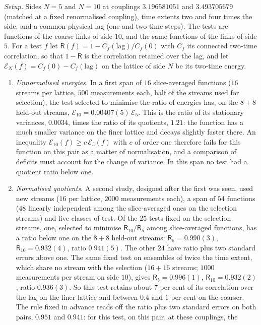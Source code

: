 \emph{Setup.} Sides $N=5$ and $N=10$ at couplings $3.196581051$ and $3.493705679$ (matched at a fixed
renormalised coupling), time extents two and four times the side, and a common physical lag (one and two time
steps). The tests are functions of the coarse links of side $10$, and the same functions of the links of side
$5$. For a test $f$ let $\mathsf R(f)=1-C_f(\mathrm{lag})/C_f(0)$ with $C_f$ its connected two-time
correlation, so that $1-\mathsf R$ is the correlation retained over the lag, and let
$\mathcal E_N(f)=C_f(0)-C_f(\mathrm{lag})$ on the lattice of side $N$ be its two-time energy.
\begin{enumerate}
\item \emph{Unnormalised energies.} In a first span of $16$ slice-averaged functions ($16$ streams per
lattice, $500$ measurements each, half of the streams used for selection), the test selected to minimise the
ratio of energies has, on the $8+8$ held-out streams, $\mathcal E_{10}=0.00407(5)\,\mathcal E_5$. This is the
ratio of its stationary variances, $0.0034$, times the ratio of its quotients, $1.21$: the function has a much
smaller variance on the finer lattice and decays slightly faster there. An inequality
$\mathcal E_{10}(f)\ge c\,\mathcal E_5(f)$ with $c$ of order one therefore fails for this function on this
pair as a matter of normalisation, and a comparison of deficits must account for the change of variance. In
this span no test had a quotient ratio below one.
\item \emph{Normalised quotients.} A second study, designed after the first was seen, used new streams ($16$
per lattice, $2000$ measurements each), a span of $54$ functions ($48$ linearly independent among the
slice-averaged ones on the selection streams) and five classes of test. Of the $25$ tests
fixed on the selection streams, one, selected to minimise $\mathsf R_{10}/\mathsf R_5$ among slice-averaged
functions, has a ratio below one on the $8+8$ held-out streams: $\mathsf R_5=0.990(3)$,
$\mathsf R_{10}=0.932(4)$, ratio $0.941(5)$. The other $24$ have ratio plus two standard errors above one. The
same fixed test on ensembles of twice the time extent, which share no stream with the selection ($16+16$
streams; $1000$ measurements per stream on side $10$), gives $\mathsf R_5=0.996(1)$, $\mathsf R_{10}=0.932(2)$,
ratio $0.936(3)$. So this test retains about $7$ per cent of its correlation over the lag on the finer lattice
and between $0.4$ and $1$ per cent on the coarser. The rule fixed in advance reads off the ratio plus two
standard errors on both pairs, $0.951$ and $0.941$: for this test, on this pair, at these couplings, the

\end{enumerate}
